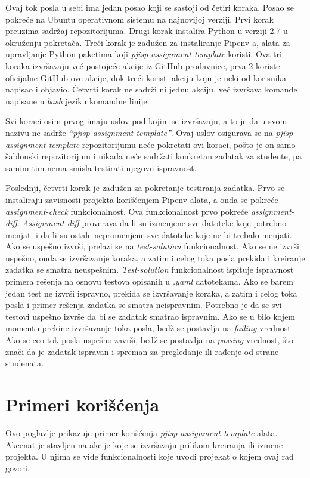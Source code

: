 \documentclass[12pt]{report}
\begin{document}
Ovaj tok posla u sebi ima jedan posao koji se sastoji od četiri koraka. Posao se pokreće na Ubuntu operativnom sistemu na najnovijoj verziji. Prvi korak preuzima sadržaj repozitorijuma. Drugi korak instalira Python u verziji 2.7 u okruženju pokretača. Treći korak je zadužen za instaliranje Pipenv-a, alata za upravljanje Python paketima koji \textit{pjisp-assignment-template} koristi. Ova tri koraka izvršavaju već postojeće akcije iz GitHub prodavnice, prva 2 koriste oficijalne GitHub-ove akcije, dok treći koristi akciju koju je neki od korisnika napisao i objavio. Ćetvrti korak ne sadrži ni jednu akciju, već izvršava komande napisane u \textit{bash} jeziku komandne linije.

Svi koraci osim prvog imaju uslov pod kojim se izvršavaju, a to je da u svom nazivu ne sadrže \textit{``pjisp-assignment-template''}. Ovaj uslov osigurava se na \textit{pjisp-assignment-template} repozitorijumu neće pokretati ovi koraci, pošto je on samo šablonski repozitorijum i nikada neće sadržati konkretan zadatak za studente, pa samim tim nema smisla testirati njegovu ispravnost.

Poslednji, četvrti korak je zadužen za pokretanje testiranja zadatka. Prvo se instaliraju zavisnosti projekta korišćenjem Pipenv alata, a onda se pokreće \textit{assignment-check} funkcionalnost. Ova funkcionalnost prvo pokreće \textit{assignment-diff}. \textit{Assignment-diff} proverava da li su izmenjene sve datoteke koje potrebno menjati i da li su ostale nepromenjene sve datoteke koje ne bi trebalo menjati. Ako se uspešno izvrši, prelazi se na \textit{test-solution} funkcionalnost. Ako se ne izvrši uspešno, onda se izvršavanje koraka, a zatim i celog toka posla prekida i kreiranje zadatka se smatra neuspešnim. \textit{Test-solution} funkcionalnost ispituje ispravnost primera rešenja na osnovu testova opisanih u \textit{.yaml} datotekama. Ako se barem jedan test ne izvrši ispravno, prekida se izvršavanje koraka, a zatim i celog toka posla i primer rešenja zadatka se smatra neispravnim. Potrebno je da se svi testovi uspešno izvrše da bi se zadatak smatrao ispravnim. Ako se u bilo kojem momentu prekine izvršavanje toka posla, bedž se postavlja na \textit{failing} vrednost. Ako se ceo tok posla uspešno završi, bedž se postavlja na \textit{passing} vrednost, što znači da je zadatak ispravan i spreman za pregledanje ili rađenje od strane studenata.

\chapter{Primeri korišćenja}
Ovo poglavlje prikazuje primer korišćenja \textit{pjisp-assignment-template} alata. Akcenat je stavljen na akcije koje se izvršavaju prilikom kreiranja ili izmene projekta. U njima se vide funkcionalnosti koje uvodi projekat o kojem ovaj rad govori.
\end{document}
